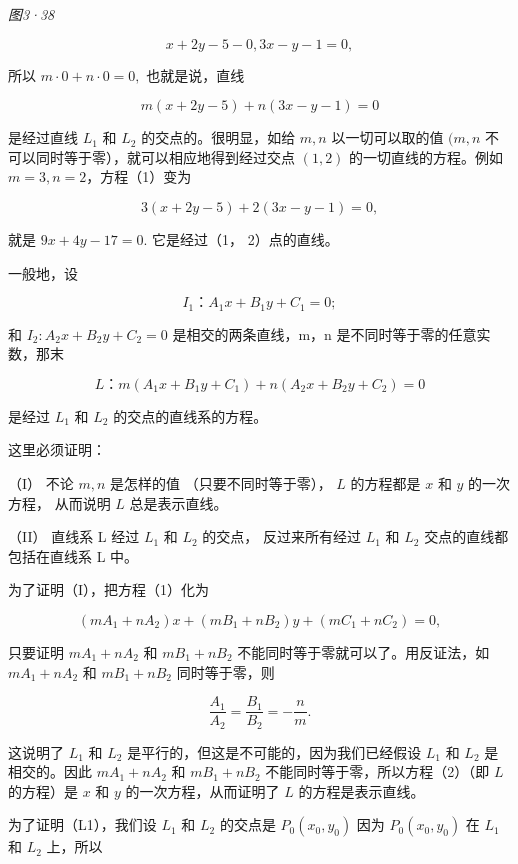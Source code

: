 \emph{图3·38}

\[
x + 2 y - 5 - 0, 3 x - y - 1 = 0,
\]

所以 \(m \cdot 0 + n \cdot 0 = 0,\) 也就是说，直线

\[
m (x + 2 y - 5) + n (3 x - y - 1) = 0
\]

是经过直线 \(L_{1}\) 和 \(L_{2}\) 的交点的。很明显，如给 \(m, n\)
以一切可以取的值 \((m, n\) 不可以同时等于零），就可以相应地得到经过交点
\((1, 2)\) 的一切直线的方程。例如 \(m = 3, n = 2\)，方程（1）变为

\[
3 (x + 2 y - 5) + 2 (3 x - y - 1) = 0,
\]

就是 \(9x + 4y - 17 = 0.\) 它是经过（1， 2）点的直线。

一般地，设

\[
I_{1}\text{：} A_{1} x + B_{1} y + C_{1} = 0;
\]

和 \(I_{2}: A_{2}x + B_{2}y + C_{2} = 0\) 是相交的两条直线，m，n
是不同时等于零的任意实数，那末

\[
L\text{：} m (A_{1} x + B_{1} y + C_{1}) + n (A_{2} x + B_{2} y + C_{2}) = 0 \tag {1}
\]

是经过 \(L_{1}\) 和 \(L_{2}\) 的交点的直线系的方程。

这里必须证明：

（I） 不论 \(m, n\) 是怎样的值 （只要不同时等于零）， \(L\) 的方程都是
\(x\) 和 \(y\) 的一次方程， 从而说明 \(L\) 总是表示直线。

（II） 直线系 L 经过 \(L_{1}\) 和 \(L_{2}\) 的交点， 反过来所有经过
\(L_{1}\) 和 \(L_{2}\) 交点的直线都包括在直线系 L 中。

为了证明（I），把方程（1）化为

\[
\left(m A_{1} + n A_{2}\right) x + \left(m B_{1} + n B_{2}\right) y + \left(m C_{1} + n C_{2}\right) = 0, \tag {2}
\]

只要证明 \(mA_{1} + nA_{2}\) 和 \(mB_{1} + nB_{2}\)
不能同时等于零就可以了。用反证法，如 \(mA_{1} + nA_{2}\) 和
\(mB_{1} + nB_{2}\) 同时等于零，则

\[
\frac {A_{1}}{A_{2}} = \frac {B_{1}}{B_{2}} = - \frac {n}{m}.
\]

这说明了 \(L_{1}\) 和 \(L_{2}\)
是平行的，但这是不可能的，因为我们已经假设 \(L_{1}\) 和 \(L_{2}\)
是相交的。因此 \(mA_{1} + nA_{2}\) 和 \(mB_{1} + nB_{2}\)
不能同时等于零，所以方程（2）（即 \(L\) 的方程）是 \(x\) 和 \(y\)
的一次方程，从而证明了 \(L\) 的方程是表示直线。

为了证明（L1），我们设 \(L_{1}\) 和 \(L_{2}\) 的交点是
\(P_{0}(x_{0},y_{0})\) 因为 \(P_{0}(x_{0},y_{0})\) 在 \(L_{1}\) 和
\(L_{2}\) 上，所以

